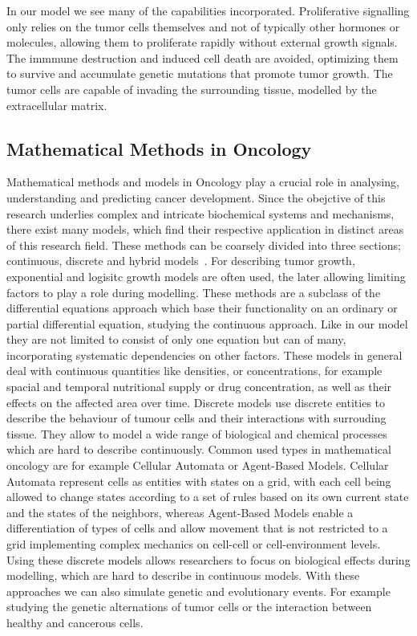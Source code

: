 In our model we see many of the capabilities incorporated. Proliferative signalling only relies on the tumor cells themselves and not of typically other hormones or molecules, allowing them to proliferate rapidly without external growth signals. The immmune destruction and induced cell death are avoided, optimizing them to survive and accumulate genetic mutations that promote tumor growth. The tumor cells are capable of invading the surrounding tissue, modelled by the extracellular matrix.

\subsection{Mathematical Methods in Oncology}
Mathematical methods and models in Oncology play a crucial role in analysing, understanding and predicting cancer development. Since the obejctive of this research underlies complex and intricate biochemical systems and mechanisms, there exist many models, which find their respective application in distinct areas of this research field. These methods can be coarsely divided into three sections; continuous, discrete and hybrid models~\cite{BEKISZ2020101198}. For describing tumor growth, exponential and logisitc growth models are often used, the later allowing limiting factors to play a role during modelling. These methods are a subclass of the differential equations approach which base their functionality on an ordinary or partial differential equation, studying the continuous approach. Like in our model they are not limited to consist of only one equation but can of many, incorporating systematic dependencies on other factors. These models in general deal with continuous quantities like densities, or concentrations, for example spacial and temporal nutritional supply or drug concentration, as well as their effects on the affected area over time. Discrete models use discrete entities to describe the behaviour of tumour cells and their interactions with surrouding tissue. They allow to model a wide range of biological and chemical processes which are hard to describe continuously. Common used types in mathematical oncology are for example Cellular Automata or Agent-Based Models. Cellular Automata represent cells as entities with states on a grid, with each cell being allowed to change states according to a set of rules based on its own current state and the states of the neighbors, whereas Agent-Based Models enable a differentiation of types of cells and allow movement that is not restricted to a grid implementing complex mechanics on cell-cell or cell-environment levels. Using these discrete models allows researchers to focus on biological effects during modelling, which are hard to describe in continuous models. With these approaches we can also simulate genetic and evolutionary events. For example studying the genetic alternations of tumor cells or the interaction between healthy and cancerous cells.\newline 
